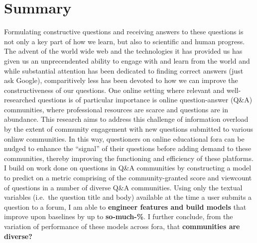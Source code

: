 \documentclass[11pt,preprint, authoryear]{article}
\title{
{\scshape\Large Department of Statistics 2019}\\
{\vskip 2.5em \scshape Predicting Community Engagement with Questions Across Online
Question-Answer Fora}\\
}
\author{Candidate Number: 10140}
\subtitle{\vspace{4em} Submitted for the Master of Science, London School of Economics,
University of London} %
\date{\scshape August 2019}
\numberwithin{equation}{section}
\numberwithin{figure}{section}
\begin{document}
\pagestyle{fancy}
\chead{}
\rhead{}
\lfoot{}
\rfoot{} 
\lhead{}
\cfoot{\footnotesize \thepage\\}


\maketitle

\thispagestyle{empty}

\clearpage

\setcounter{page}{1}

\renewcommand{\contentsname}{Table of Contents}
\hypersetup{linkcolor=black}
\tableofcontents
\newpage
\hypersetup{linkcolor=black}
\listoffigures
\newpage
\hypersetup{linkcolor=black}
\listoftables
\hypersetup{linkcolor=black}
\newpage

\section*{Summary}

Formulating constructive questions and receiving answers to these
questions is not only a key part of how we learn, but also to scientific
and human progress. The advent of the world wide web and the
technologies it has provided us has given us an unprecendented ability
to engage with and learn from the world and while substantial attention
has been dedicated to finding correct answers (just ask Google),
comparitively less has been devoted to how we can improve the
constructiveness of our questions. One online setting where relevant and
well-researched questions is of particular importance is online
question-answer (Q\&A) communities, where professional resources are
scarce and questions are in abundance. This research aims to address
this challenge of information overload by the extent of community
engagement with new questions submitted to various onlinw communities.
In this way, questioners on online educational fora can be nudged to
enhance the ``signal'' of their questions before adding demand to these
communities, thereby improving the functioning and efficiency of these
platforms. I build on work done on questions in Q\&A communities by
constructing a model to predict on a metric comprising of the
community-granted score and viewcount of questions in a number of
diverse Q\&A communities. Using only the textual variables (i.e.~the
question title and body) available at the time a user submits a question
to a forum, I am able to \textbf{engineer features and build models}
that improve upon baselines by up to \textbf{so-much-\%}. I further
conclude, from the variation of performance of these models across fora,
that \textbf{communities are diverse?}
\end{document}
